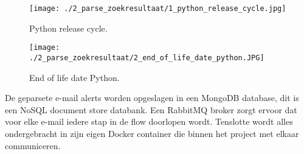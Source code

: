 \begin{figure}
    \centering
    \texttt{[image: ./2\_parse\_zoekresultaat/1\_python\_release\_cycle.jpg]}
    \caption[Python release cycle.]{\label{fig:Python release cycle}Python release cycle.\autocite{pythonreleasecycle2025}}
\end{figure}
\begin{figure}
    \centering
    \texttt{[image: ./2\_parse\_zoekresultaat/2\_end\_of\_life\_date\_python.JPG]}
    \caption[End of life date Python.]{\label{fig:End of life date Python}End of life date Python.\autocite{endoflifedatepython2025}}
\end{figure}
\FloatBarrier
De geparsete e-mail alerts worden opgeslagen in een MongoDB database, dit is een NoSQL document store databank. Een RabbitMQ broker zorgt ervoor dat voor elke e-mail iedere stap in de flow doorlopen wordt. Tenslotte wordt alles ondergebracht in zijn eigen Docker container die binnen het project met elkaar communiceren.


